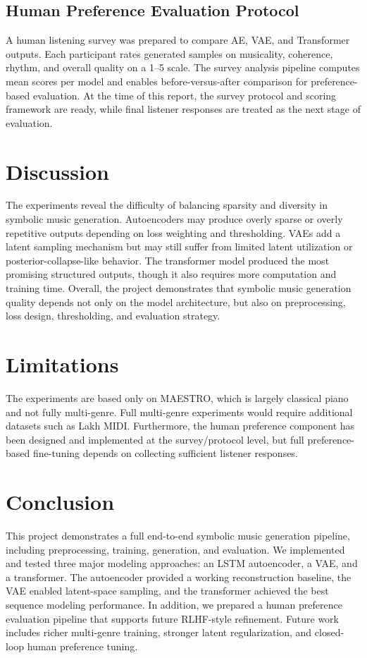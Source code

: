 \documentclass[conference]{IEEEtran}
\begin{document}
\subsection{Human Preference Evaluation Protocol}
A human listening survey was prepared to compare AE, VAE, and Transformer outputs. Each participant rates generated samples on musicality, coherence, rhythm, and overall quality on a 1--5 scale. The survey analysis pipeline computes mean scores per model and enables before-versus-after comparison for preference-based evaluation. At the time of this report, the survey protocol and scoring framework are ready, while final listener responses are treated as the next stage of evaluation.

\section{Discussion}
The experiments reveal the difficulty of balancing sparsity and diversity in symbolic music generation. Autoencoders may produce overly sparse or overly repetitive outputs depending on loss weighting and thresholding. VAEs add a latent sampling mechanism but may still suffer from limited latent utilization or posterior-collapse-like behavior. The transformer model produced the most promising structured outputs, though it also requires more computation and training time. Overall, the project demonstrates that symbolic music generation quality depends not only on the model architecture, but also on preprocessing, loss design, thresholding, and evaluation strategy.

\section{Limitations}
The experiments are based only on MAESTRO, which is largely classical piano and not fully multi-genre. Full multi-genre experiments would require additional datasets such as Lakh MIDI. Furthermore, the human preference component has been designed and implemented at the survey/protocol level, but full preference-based fine-tuning depends on collecting sufficient listener responses.

\section{Conclusion}
This project demonstrates a full end-to-end symbolic music generation pipeline, including preprocessing, training, generation, and evaluation. We implemented and tested three major modeling approaches: an LSTM autoencoder, a VAE, and a transformer. The autoencoder provided a working reconstruction baseline, the VAE enabled latent-space sampling, and the transformer achieved the best sequence modeling performance. In addition, we prepared a human preference evaluation pipeline that supports future RLHF-style refinement. Future work includes richer multi-genre training, stronger latent regularization, and closed-loop human preference tuning.



\end{document}
